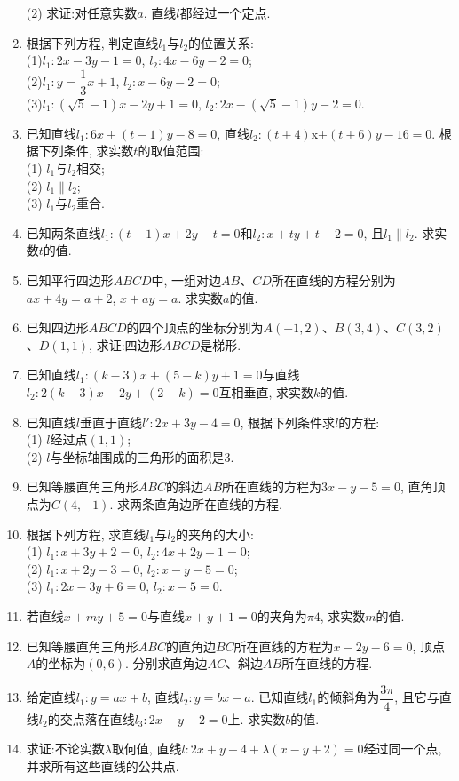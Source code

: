 \documentclass[10pt,a4paper]{article}
\begin{document}
\begin{enumerate}[1.]
(2) 求证:对任意实数$a$, 直线$l$都经过一个定点.
\item 根据下列方程, 判定直线$l_1$与$l_2$的位置关系:\\
(1)$l_1: 2x-3y-1=0$, $l_2: 4x-6y-2=0$;\\
(2)$l_1: y=\dfrac 13x+1$, $l_2: x-6y-2=0$;\\
(3)$l_1: (\sqrt 5-1)x-2y+1=0$, $l_2: 2x-(\sqrt 5-1)y-2=0$.
\item 已知直线$l_1: 6x+(t-1)y-8=0$, 直线$l_2: (t+4)$x+$(t+6)y-16=0$. 根据下列条件, 求实数$t$的取值范围:\\
(1) $l_1$与$l_2$相交;\\
(2) $l_1\parallel l_2$;\\
(3) $l_1$与$l_2$重合.
\item 已知两条直线$l_1: (t-1)x+2y-t=0$和$l_2: $$x+ty+t-2=0$, 且$l_1\parallel l_2$. 求实数$t$的值.
\item 已知平行四边形$ABCD$中, 一组对边$AB$、$CD$所在直线的方程分别为$ax+4y=a+2$, $x+ay=a$. 求实数$a$的值.
\item 已知四边形$ABCD$的四个顶点的坐标分别为$A(-1, 2)$、$B(3, 4)$、$C(3, 2)$、$D(1, 1)$, 求证:四边形$ABCD$是梯形.
\item 已知直线$l_1: (k-3)x+(5-k)y+1=0$与直线$l_2: 2(k-3)x-2y+(2-k)=0$互相垂直, 求实数$k$的值.
\item 已知直线$l$垂直于直线$l': 2x+3y-4=0$, 根据下列条件求$l$的方程:\\
(1) $l$经过点$(1, 1)$;\\
(2) $l$与坐标轴围成的三角形的面积是$3$.
\item 已知等腰直角三角形$ABC$的斜边$AB$所在直线的方程为$3x-y-5=0$, 直角顶点为$C(4, -1)$. 求两条直角边所在直线的方程.
\item 根据下列方程, 求直线$l_1$与$l_2$的夹角的大小:\\
(1) $l_1: x+3y+2=0$, $l_2: 4x+2y-1=0$;\\
(2) $l_1: x+2y-3=0$, $l_2: x-y-5=0$;\\
(3) $l_1: 2x-3y+6=0$, $l_2: x-5=0$.
\item 若直线$x+my+5=0$与直线$x+y+1=0$的夹角为$\pi 4$, 求实数$m$的值.
\item 已知等腰直角三角形$ABC$的直角边$BC$所在直线的方程为$x-2y-6=0$, 顶点$A$的坐标为$(0, 6)$. 分别求直角边$AC$、斜边$AB$所在直线的方程.
\item 给定直线$l_1: y=ax+b$, 直线$l_2: y=bx-a$. 已知直线$l_1$的倾斜角为$\dfrac{3\pi} 4$, 且它与直线$l_2$的交点落在直线$l_3: 2x+y-2=0$上. 求实数$b$的值.
\item 求证:不论实数$\lambda$取何值, 直线$l: 2x+y-4+\lambda (x-y+2)=0$经过同一个点, 并求所有这些直线的公共点.
$$
\end{enumerate}
\end{document}
